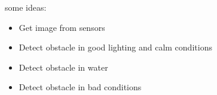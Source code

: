 some ideas:
\begin{itemize}
\item Get image from sensors
\item Detect obstacle in good lighting and calm conditions
\item Detect obstacle in water
\item Detect obstacle in bad conditions
\end{itemize}
